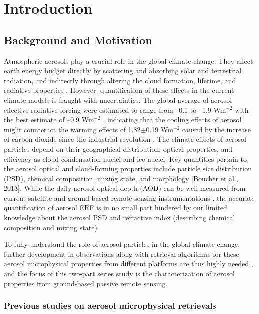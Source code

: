 \chapter{Introduction}

\section{Background and Motivation}

Atmospheric aerosols play a crucial role in the global climate change. They
affect earth energy budget directly by scattering and absorbing solar and
terrestrial radiation, and indirectly through altering the cloud formation,
lifetime, and radiative properties \citep{Haywood00,Ramanathan01}.
However, quantification of these effects in the current climate
models is fraught with uncertainties. The global average of aerosol effective
radiative forcing were estimated to range from --0.1 to --1.9 Wm$^{-2}$ with the 
best estimate of --0.9 Wm$^{-2}$ \citep{Boucher13}, indicating that the cooling
effects of aerosol might counteract the warming effects of 1.82$\pm$0.19 Wm$^{-2}$
caused by the increase of carbon dioxide since the industrial revolution 
\citep{Myhre13}. The climate effects of aerosol particles depend on their
geographical distribution, optical properties, and efficiency as cloud
condensation nuclei and ice nuclei. 
Key quantities pertain to the aerosol optical and
cloud-forming properties include particle size distribution (PSD), chemical
composition, mixing state, and morphology [Boucher et al., 2013]. While the
daily aerosol optical depth (AOD) can be well measured from current satellite
and ground-based remote sensing instrumentations \citep[e.g.,][]{Holben98,Kaufman02},
the accurate quantification of aerosol ERF is in no
small part hindered by our limited knowledge about the aerosol PSD and
refractive index (describing chemical composition and mixing state). 

To fully understand the role of aerosol particles in the global climate change, 
further development in observations along with retrieval algorithms for these
aerosol microphysical properties from different platforms are thus highly
needed \citep{Mishchenko04}, and the focus of this two-part series study
is the characterization of aerosol properties from ground-based passive remote
sensing.

\subsection{Previous studies on aerosol microphysical retrievals}

